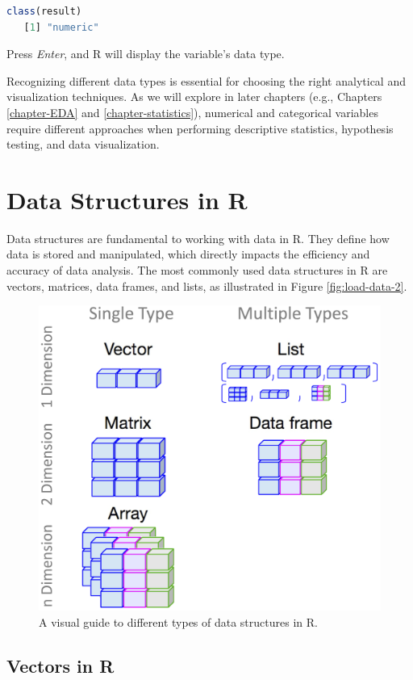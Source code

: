 \documentclass[
  11pt,
]{book}
\theoremstyle{definition}
\theoremstyle{definition}
\theoremstyle{definition}
\theoremstyle{definition}
\theoremstyle{remark}
\begin{document}
\begin{lstlisting}[language=R]
class(result)
   [1] "numeric"
\end{lstlisting}

Press \emph{Enter}, and R will display the variable's data type.

Recognizing different data types is essential for choosing the right analytical and visualization techniques. As we will explore in later chapters (e.g., Chapters \ref{chapter-EDA} and \ref{chapter-statistics}), numerical and categorical variables require different approaches when performing descriptive statistics, hypothesis testing, and data visualization.

\section{Data Structures in R}\label{data-structures-in-r}

Data structures are fundamental to working with data in R. They define how data is stored and manipulated, which directly impacts the efficiency and accuracy of data analysis. The most commonly used data structures in R are vectors, matrices, data frames, and lists, as illustrated in Figure \ref{fig:load-data-2}.

\begin{figure}[H]

{\centering \includegraphics[width=0.6\linewidth]{images/ch1_R-objects} 

}

\caption{A visual guide to different types of data structures in R.}\label{fig:R-objects}
\end{figure}

\subsection*{Vectors in R}\label{vectors-in-r}
\end{document}
